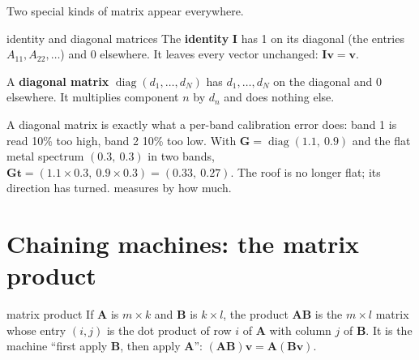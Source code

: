 \documentclass[11pt,a4paper,oneside,openany]{book}
\newcommand{\B}[1]{{\symbf{#1}}}
\newcommand{\B}[1]{{\bm{#1}}}
\newcommand{\vt}{\B{t}}
\newcommand{\vv}{\B{v}}
\newcommand{\mG}{\B{G}}
\newcommand{\mI}{\B{I}}
\newcommand{\mA}{\B{A}}
\newcommand{\mB}{\B{B}}
\begin{document}
Two special kinds of matrix appear everywhere.

\begin{defn}{identity and diagonal matrices}
The \textbf{identity} $\mI$ has 1 on its diagonal (the entries $A_{11},A_{22},\dots$) and 0 elsewhere. It leaves every vector
unchanged: $\mI\vv=\vv$.

A \textbf{diagonal matrix} $\operatorname{diag}(d_1,\dots,d_N)$ has $d_1,\dots,d_N$ on the diagonal and 0 elsewhere. It
multiplies component $n$ by $d_n$ and does nothing else.
\end{defn}

A diagonal matrix is exactly what a per-band calibration error does: band 1 is read 10\% too high, band 2 10\% too low. With
$\mG=\operatorname{diag}(1.1,\ 0.9)$ and the flat metal spectrum $(0.3,\ 0.3)$ in two bands, $\mG\vt=(1.1\times0.3,\
0.9\times0.3)=(0.33,\ 0.27)$. The roof is no longer flat; its direction has turned.  measures by how much.

\section{Chaining machines: the matrix product}

\begin{defn}{matrix product}
If $\mA$ is $m\times k$ and $\mB$ is $k\times l$, the product $\mA\mB$ is the $m\times l$ matrix whose entry $(i,j)$ is the dot
product of row $i$ of $\mA$ with column $j$ of $\mB$. It is the machine ``first apply $\mB$, then apply $\mA$'':
$(\mA\mB)\vv=\mA(\mB\vv)$.
\end{defn}
\end{document}
